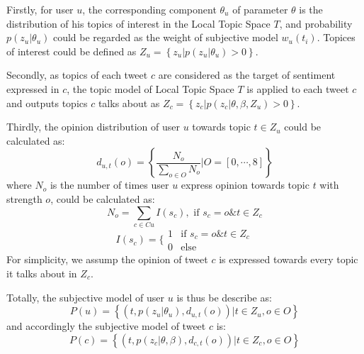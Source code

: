 \documentclass{acm_proc_article-sp}
\begin{document}
\begin{itemize*}
\item Firstly, for user $ u $, the corresponding component $ \theta_{u} $ of parameter $ \theta $ is the distribution of his topics of interest in the Local Topic Space $ T $, and probability $ p\left( z_{u} \vert \theta_{u} \right)  $ could be regarded as the weight of subjective model $ w_{u} \left( t_{i} \right)  $. Topices of interest could be defined as $ Z_{u}= \left\lbrace z_{u} \vert p\left( z_{u} \vert \theta_{u} \right)>0 \right\rbrace $.
\item Secondly, as topics of each tweet $ c $ are considered as the target of sentiment expressed in $ c $, the topic model of Local Topic Space $ T $ is applied to each tweet $ c $ and outputs topics $ c $ talks about as $ Z_{c} =\left\lbrace z_{c} \vert p\left( z_{c} \vert \theta, \beta, Z_{u} \right)>0 \right\rbrace $.
\item Thirdly, the opinion distribution of user $ u $ towards topic $ t \in Z_{u} $ could be calculated as:
\begin{equation}
d_{u,t}\left( o \right) = \left\lbrace \dfrac{N_{o}}{\sum_{o \in O} N_{o}} \vert O=\left[ 0, \cdots, 8 \right] \right\rbrace 
\end{equation}
where $ N_{o} $ is the number of times user $ u $ express opinion towards topic $ t $ with strength $ o $, could be calculated as:
\begin{equation}
N_{o}=\sum_{c \in Cu} I\left( s_{c} \right) , \text{ if } s_{c}=o \& t \in Z_{c}
\end{equation}
\begin{equation}
I\left( s_{c} \right)=\lbrace
\begin{array}{ll}
{1} & \text{if } s_{c}=o \& t \in Z_{c}\\
{0} & \text{else}
\end{array}
\end{equation}
For simplicity, we assump the opinion of tweet $ c $ is expressed towards every topic it talks about in $ Z_{c} $.
\end{itemize*}
Totally, the subjective model of user $ u $ is thus be describe as:
\begin{equation}
P\left( u \right)= \left\lbrace \left( t, p\left( z_{u} \vert \theta_{u} \right), d_{u,t}\left( o \right) \right)  \vert t \in Z_{u}, o \in O  \right\rbrace  
\end{equation}
and accordingly the subjective model of tweet $ c $ is:
\begin{equation}
P\left( c \right)= \left\lbrace \left( t, p\left( z_{c} \vert \theta, \beta \right), d_{c,t}\left( o \right) \right)  \vert t \in Z_{c}, o \in O  \right\rbrace  
\end{equation}
\end{document}
